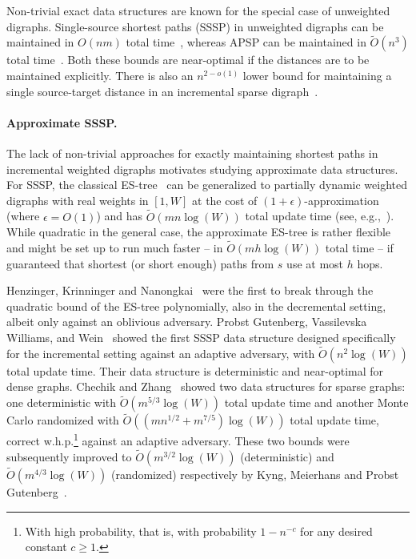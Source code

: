 \documentclass[11pt,letterpaper]{article}
\theoremstyle{plain}
\renewcommand{\O}{O}
\newcommand{\Ot}{\ensuremath{\widetilde{\O}}}
\newcommand{\eps}{\ensuremath{\epsilon}}
\begin{document}
Non-trivial exact data structures are known for the special case of unweighted digraphs. Single-source shortest paths (SSSP) in unweighted digraphs can be maintained in $O(nm)$ total time~\cite{EvenS81,HenzingerK95}, whereas APSP can be maintained in $\Ot(n^3)$ total time~\cite{AusielloIMN92}.
Both these bounds are near-optimal if the distances are to be maintained explicitly.
There is also an $n^{2-o(1)}$ lower bound for maintaining a single source-target distance in an incremental sparse digraph~\cite{GutenbergWW20}. 

\paragraph{Approximate SSSP.} The lack of non-trivial approaches for exactly maintaining shortest paths in incremental weighted digraphs motivates studying approximate data structures.
For SSSP, the classical ES-tree~\cite{EvenS81,HenzingerK95} can be generalized to partially dynamic weighted digraphs with real weights in $[1,W]$ at the cost of $(1+\eps)$-approximation (where $\eps=O(1)$) and has $\Ot(mn\log(W))$ total update time (see, e.g.,~\cite{Bernstein09, Bernstein16}).
While quadratic in the general case, the approximate ES-tree is rather flexible and might be set up to run much faster -- in $\Ot(mh\log(W))$ total time -- if guaranteed that shortest (or short enough) paths from $s$ use at most $h$ hops.

Henzinger, Krinninger and Nanongkai~\cite{HenzingerKN14,HenzingerKN15} were the first to break through the quadratic bound of the ES-tree polynomially, also in the decremental setting, albeit only against an oblivious adversary.
Probst Gutenberg, Vassilevska Williams, and Wein~\cite{GutenbergWW20} showed the first SSSP data structure designed specifically for the incremental setting against an adaptive adversary, with $\Ot(n^2\log(W))$ total update time.
Their data structure is deterministic and near-optimal for dense graphs.
Chechik and Zhang~\cite{ChechikZ21} showed two data structures for sparse graphs: one deterministic with $\Ot(m^{5/3}\log(W))$ total update time and another Monte Carlo randomized with $\Ot((mn^{1/2}+m^{7/5})\log(W))$ total update time, correct w.h.p.\footnote{With high probability, that is, with probability $1-n^{-c}$ for any desired constant $c\geq 1$.} against an adaptive adversary.
These two bounds were subsequently improved to $\Ot(m^{3/2}\log(W))$ (deterministic) and $\Ot(m^{4/3}\log(W))$ (randomized) respectively by Kyng, Meierhans and Probst Gutenberg~\cite{KyngMG22}.
\end{document}
